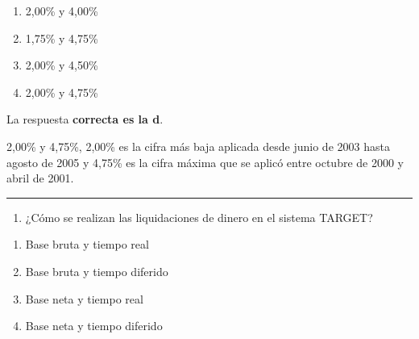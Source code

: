 \documentclass[
  letterpaper,
  DIV=11,
  numbers=noendperiod]{scrreprt}
\providecommand{\tightlist}{%
  \setlength{\itemsep}{0pt}\setlength{\parskip}{0pt}}\usepackage{longtable,booktabs,array}
\begin{document}
\begin{enumerate}
\def\labelenumi{\alph{enumi})}
\item
  2,00\% y 4,00\%
\item
  1,75\% y 4,75\%
\item
  2,00\% y 4,50\%
\item
  2,00\% y 4,75\%
\end{enumerate}

\begin{tcolorbox}[enhanced jigsaw, left=2mm, opacityback=0, colback=white, breakable, arc=.35mm, bottomrule=.15mm, rightrule=.15mm, toprule=.15mm, leftrule=.75mm, colframe=quarto-callout-tip-color-frame]
\begin{minipage}[t]{5.5mm}
\textcolor{quarto-callout-tip-color}{\faLightbulb}
\end{minipage}%
\begin{minipage}[t]{\textwidth - 5.5mm}

La respuesta \textbf{correcta es la d}.

2,00\% y 4,75\%, 2,00\% es la cifra más baja aplicada desde junio de
2003 hasta agosto de 2005 y 4,75\% es la cifra máxima que se aplicó
entre octubre de 2000 y abril de 2001.

\end{minipage}%
\end{tcolorbox}

\begin{center}\rule{0.5\linewidth}{0.5pt}\end{center}

\begin{enumerate}
\def\labelenumi{\arabic{enumi}.}
\setcounter{enumi}{35}
\tightlist
\item
  ¿Cómo se realizan las liquidaciones de dinero en el sistema TARGET?
\end{enumerate}

\begin{enumerate}
\def\labelenumi{\alph{enumi})}
\item
  Base bruta y tiempo real
\item
  Base bruta y tiempo diferido
\item
  Base neta y tiempo real
\item
  Base neta y tiempo diferido
\end{enumerate}
\end{document}
